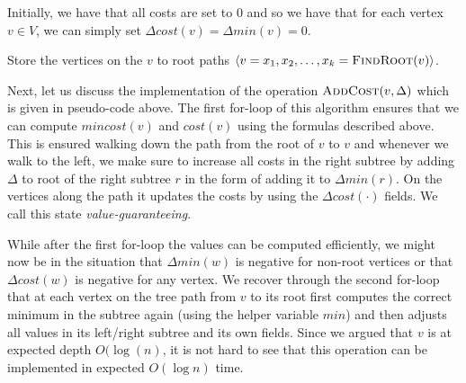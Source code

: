 Initially, we have that all costs are set to $0$ and so we have that for each vertex $v \in V$, we can simply set $\Delta cost(v) = \Delta min(v) = 0$. 

\begin{algorithm}
  \SetAlgoLined
  \DontPrintSemicolon
  Store the vertices on the $v$ to root paths $\langle v = x_1, x_2, \ldots, x_k = \textsc{FindRoot}(v)\rangle$.\\
  
  \caption{$\textsc{AddCost}(v, \Delta)$}
\end{algorithm}

Next, let us discuss the implementation of the operation $\textsc{AddCost}(v, \Delta)$ which is given in pseudo-code above. The first for-loop of this algorithm ensures that we can compute $mincost(v)$ and $cost(v)$ using the formulas described above. This is ensured walking down the path from the root of $v$ to $v$ and whenever we walk to the left, we make sure to increase all costs in the right subtree by adding $\Delta$ to root of the right subtree $r$ in the form of adding it to $\Delta min(r)$. On the vertices along the path it updates the costs by using the $\Delta cost(\cdot)$ fields. We call this state \emph{value-guaranteeing}.

While after the first for-loop the values can be computed efficiently, we might now be in the situation that $\Delta min(w)$ is negative for non-root vertices or that $\Delta cost(w)$ is negative for any vertex. We recover through the second for-loop that at each vertex on the tree path from $v$ to its root first computes the correct minimum in the subtree again (using the helper variable $min$) and then adjusts all values in its left/right subtree and its own fields. Since we argued that $v$ is at expected depth $O(\log(n)$, it is not hard to see that this operation can be implemented in expected $O(\log n)$ time.

